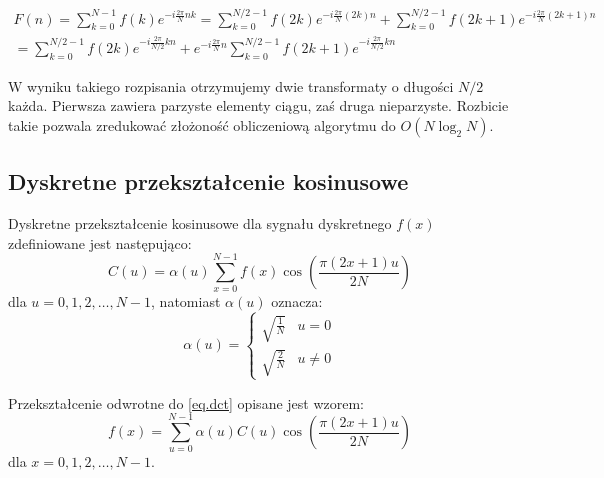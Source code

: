 \documentclass{classrep}
\begin{document}
\begin{equation}
  \label{wzor.fft}
  \begin{array}{c}
    F(n) = \displaystyle \sum_{k=0}^{N-1} f(k) e^{-i\frac{2\pi}{N}nk} = \displaystyle\sum_{k = 0}^{N/2 - 1} f(2k) e^{-i\frac{2\pi}{N}(2k)n} + \displaystyle\sum_{k = 0}^{N/2 - 1} f(2k + 1) e^{-i\frac{2\pi}{N}(2k + 1)n} \\
    = \displaystyle\sum_{k = 0}^{N/2 - 1} f(2k) e^{-i\frac{2\pi}{N/2}kn} + e^{-i\frac{2\pi}{N}n}\displaystyle\sum_{k = 0}^{N/2 - 1} f(2k + 1) e^{-i\frac{2\pi}{N/2}kn}
  \end{array}
\end{equation}

W wyniku takiego rozpisania otrzymujemy dwie transformaty o długości $N / 2$ każda. Pierwsza zawiera parzyste elementy ciągu, zaś druga \ppauza nieparzyste. Rozbicie takie pozwala zredukować złożoność obliczeniową algorytmu do $O(N\log_2 N)$.

\subsection{Dyskretne przekształcenie kosinusowe}
Dyskretne przekształcenie kosinusowe dla sygnału dyskretnego $f(x)$ zdefiniowane jest następująco:
\begin{equation}
  \label{eq.dct}
  C(u) = \alpha (u) \displaystyle \sum_{x = 0}^{N - 1} f(x) \cos \left(\frac{\pi(2x + 1)u}{2N}\right)
\end{equation}
dla $u = 0, 1, 2, \ldots, N - 1$, natomiast $\alpha(u)$ oznacza:
\begin{equation}
  \label{eq.dctalpha}
  \alpha(u) = \begin{cases} \sqrt{\frac{1}{N}} & \text{$u = 0$} \\
			    \sqrt{\frac{2}{N}} & \text{$u \neq 0$}
              \end{cases}
\end{equation}

Przekształcenie odwrotne do \ref{eq.dct} opisane jest wzorem:
\begin{equation}
  \label{eq.idct}
  f(x) = \displaystyle \sum_{u = 0}^{N - 1} \alpha(u) C(u) \cos \left(\frac{\pi(2x + 1)u}{2N}\right)
\end{equation}
dla $x = 0, 1, 2, \ldots, N - 1$.

\clearpage
\end{document}
